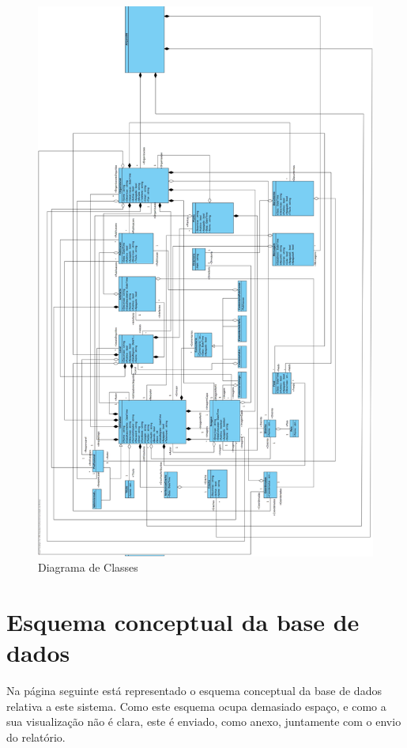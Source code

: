 ﻿\documentclass[12pt,a4paper]{article}
\begin{document}
\begin{figure}[h!]
\centering
\includegraphics[scale=0.2]{classes}
\caption{Diagrama de Classes} 
\end{figure} 

\clearpage
\section{Esquema conceptual da base de dados}
Na página seguinte está representado o esquema conceptual da base de dados relativa a este sistema. Como este esquema ocupa demasiado espaço, e como  a sua visualização não é clara, este é enviado, como anexo, juntamente com o envio do relatório.\\
\end{document}
